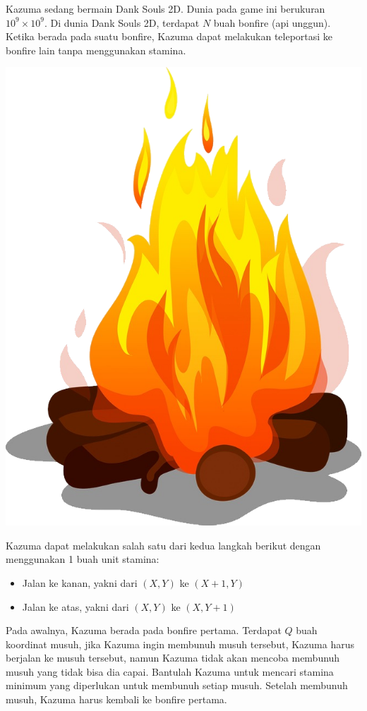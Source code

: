 \documentclass{article}
\begin{document}
Kazuma sedang bermain Dank Souls 2D. Dunia pada game ini berukuran $10^9 \times 10^9$. Di dunia Dank Souls 2D, terdapat $N$ buah bonfire (api unggun). Ketika berada pada suatu bonfire, Kazuma dapat melakukan teleportasi ke bonfire lain tanpa menggunakan stamina.
\begin{center}
\includegraphics[scale=0.12]{bonfire.png}
\end{center}
Kazuma dapat melakukan salah satu dari kedua langkah berikut dengan menggunakan 1 buah unit stamina:
\begin{itemize}
    \item Jalan ke kanan, yakni dari $(X, Y)$ ke $(X + 1, Y)$
    \item Jalan ke atas, yakni dari $(X, Y)$ ke $(X, Y + 1)$
\end{itemize}
Pada awalnya, Kazuma berada pada bonfire pertama. Terdapat $Q$ buah koordinat musuh, jika Kazuma ingin membunuh musuh tersebut, Kazuma harus berjalan ke musuh tersebut, namun Kazuma tidak akan mencoba membunuh musuh yang tidak bisa dia capai. Bantulah Kazuma untuk mencari stamina minimum yang diperlukan untuk membunuh setiap musuh. Setelah membunuh musuh, Kazuma harus kembali ke bonfire pertama.
\end{document}
